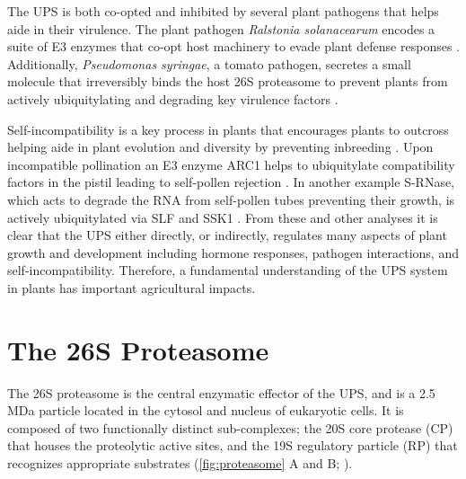 	The UPS is both co-opted and inhibited by several plant pathogens that helps aide in their virulence. The plant pathogen \textit{Ralstonia solanacearum} encodes a suite of E3 enzymes that co-opt host machinery to evade plant defense responses \citep{angot06}. Additionally, \textit{Pseudomonas syringae}, a tomato pathogen, secretes a small molecule that irreversibly binds the host 26S proteasome to prevent plants from actively ubiquitylating and degrading key virulence factors \citep{schellenberg10}. 

	Self-incompatibility is a key process in plants that encourages plants to outcross helping aide in plant evolution and diversity by preventing inbreeding \citep{zhang09}. Upon incompatible pollination an E3 enzyme ARC1 helps to ubiquitylate compatibility factors in the pistil leading to self-pollen rejection \citep{stone03}. In another example S-RNase, which acts to degrade the RNA from self-pollen tubes preventing their growth, is actively ubiquitylated via SLF and SSK1 \citep{mcclure04, zhao10}. From these and other analyses it is clear that the UPS either directly, or indirectly, regulates many aspects of plant growth and development including hormone responses, pathogen interactions, and self-incompatibility. Therefore, a fundamental understanding of the UPS system in plants has important agricultural impacts.     

\section{The 26S Proteasome}
	The 26S proteasome is the central enzymatic effector of the UPS, and is a 2.5 MDa particle located in the cytosol and nucleus of eukaryotic cells.  It is composed of two functionally distinct sub-complexes; the 20S core protease (CP) that houses the proteolytic active sites, and the 19S regulatory particle (RP) that recognizes appropriate substrates (\ref{fig:proteasome} A and B; \citep{bhattacharyya14, finley09, lander12, lasker12, unverdorben14}).

